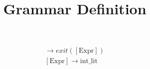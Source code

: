 \documentclass[11pt]{article}
\title{Grammar Definition}
\begin{document}
\maketitle

\begin{align}
    [\text{Exit}] \to exit([\text{Expr}])
    \\
    [\text{Expr}] \to \text{int\_lit}
\end{align}
\end{document}
